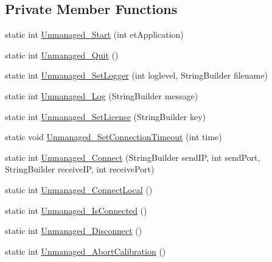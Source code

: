 \subsection*{Private Member Functions}
\begin{DoxyCompactItemize}
\item 
static int \hyperlink{class_web_analyzer_1_1_eye_tracking_1_1_eye_tracking_controller_ae4b3336bdd5ecb6c679599cfbbb52f18}{Unmanaged\+\_\+\+Start} (int et\+Application)
\item 
static int \hyperlink{class_web_analyzer_1_1_eye_tracking_1_1_eye_tracking_controller_adf05304c2fcffc951c7c4e97202d53f2}{Unmanaged\+\_\+\+Quit} ()
\item 
static int \hyperlink{class_web_analyzer_1_1_eye_tracking_1_1_eye_tracking_controller_af2813c6a45424092388ceddf81fe198a}{Unmanaged\+\_\+\+Set\+Logger} (int loglevel, String\+Builder filename)
\item 
static int \hyperlink{class_web_analyzer_1_1_eye_tracking_1_1_eye_tracking_controller_a55821e900d10c86e3445cb2abb13a480}{Unmanaged\+\_\+\+Log} (String\+Builder message)
\item 
static int \hyperlink{class_web_analyzer_1_1_eye_tracking_1_1_eye_tracking_controller_aafadd17538ada462008ad1d2fc18ad8f}{Unmanaged\+\_\+\+Set\+License} (String\+Builder key)
\item 
static void \hyperlink{class_web_analyzer_1_1_eye_tracking_1_1_eye_tracking_controller_a5cf8aa0f50046671963fa2c1e9a78f74}{Unmanaged\+\_\+\+Set\+Connection\+Timeout} (int time)
\item 
static int \hyperlink{class_web_analyzer_1_1_eye_tracking_1_1_eye_tracking_controller_a9b618893ab69887e535f30ad8f37851c}{Unmanaged\+\_\+\+Connect} (String\+Builder send\+I\+P, int send\+Port, String\+Builder receive\+I\+P, int receive\+Port)
\item 
static int \hyperlink{class_web_analyzer_1_1_eye_tracking_1_1_eye_tracking_controller_a7274ebe71919f5779c78fad75cc59a2d}{Unmanaged\+\_\+\+Connect\+Local} ()
\item 
static int \hyperlink{class_web_analyzer_1_1_eye_tracking_1_1_eye_tracking_controller_a3c5a3f00aebfa5783603d222cafc3e7c}{Unmanaged\+\_\+\+Is\+Connected} ()
\item 
static int \hyperlink{class_web_analyzer_1_1_eye_tracking_1_1_eye_tracking_controller_a7a9c03210ec2453f1c3d0afc885f669a}{Unmanaged\+\_\+\+Disconnect} ()
\item 
static int \hyperlink{class_web_analyzer_1_1_eye_tracking_1_1_eye_tracking_controller_ad8c50cfe638e9489add1d8cce83418f9}{Unmanaged\+\_\+\+Abort\+Calibration} ()

\end{DoxyCompactItemize}
